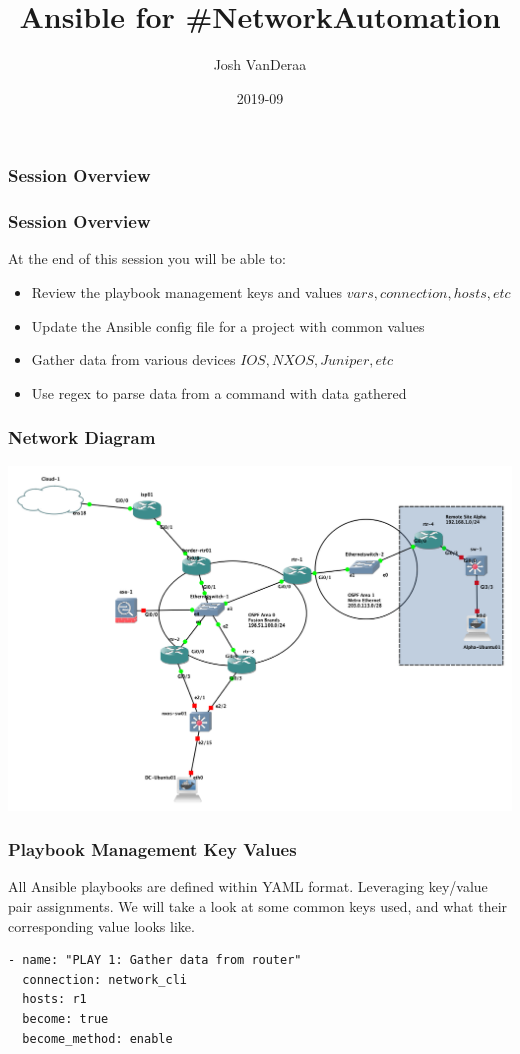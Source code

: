 \documentclass{beamer}
\title{Ansible for \#NetworkAutomation}
\author{Josh VanDeraa}
\date{2019-09}
\begin{document}
\frame{\titlepage}

\begin{frame}
    \frametitle{Session Overview}
    \tableofcontents
\end{frame}

\begin{frame}
\frametitle{Session Overview}
At the end of this session you will be able to:
\begin{itemize}
  \item <2-> Review the playbook management keys and values \(vars, connection, hosts, etc\)
  \item <3-> Update the Ansible config file for a project with common values
  \item <4-> Gather data from various devices \(IOS, NXOS, Juniper, etc\)
  \item <5-> Use regex to parse data from a command with data gathered
\end{itemize}
\end{frame}

\begin{frame}
\frametitle{Network Diagram}
\includegraphics[width=\textwidth]{assets/base_setup.png}
    
\end{frame}

\begin{frame}[fragile]
    \frametitle{Playbook Management Key Values}
    All Ansible playbooks are defined within YAML format. Leveraging key/value
    pair assignments. We will take a look at some common keys used, and what their
    corresponding value looks like.
\begin{verbatim}
- name: "PLAY 1: Gather data from router"
  connection: network_cli
  hosts: r1
  become: true
  become_method: enable
\end{verbatim}
\end{frame}
\end{document}
